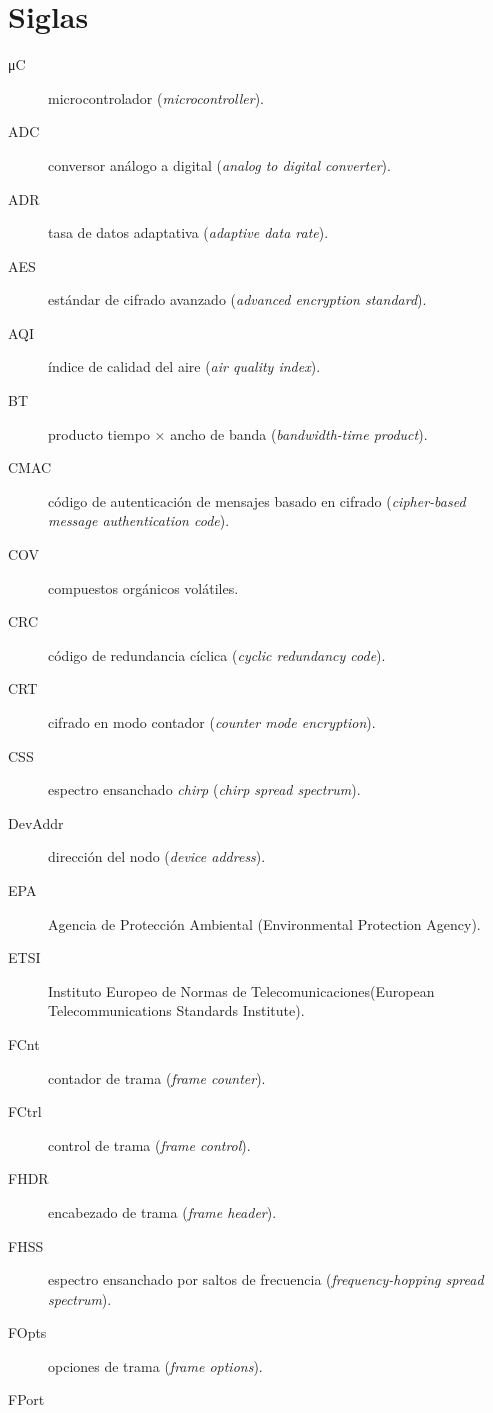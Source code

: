 \chapter*{Siglas}
\thispagestyle{empty}

\begin{description}
  \item[μC]
    microcontrolador (\emph{microcontroller}).
  \item[ADC]
    conversor análogo a digital (\emph{analog to digital converter}).
  \item[ADR]
    tasa de datos adaptativa (\emph{adaptive data rate}).
  \item[AES]
    estándar de cifrado avanzado (\emph{advanced encryption standard}).
  \item[AQI]
    índice de calidad del aire (\emph{air quality index}).
  \item[BT]
    producto tiempo × ancho de banda (\emph{bandwidth-time product}).
  \item[CMAC]
    código de autenticación de mensajes basado en cifrado (\emph{cipher-based message authentication code}).
  \item[COV]
    compuestos orgánicos volátiles.
  \item[CRC]
    código de redundancia cíclica (\emph{cyclic redundancy code}).
  \item[CRT]
    cifrado en modo contador (\emph{counter mode encryption}).
  \item[CSS]
    espectro ensanchado \emph{chirp} (\emph{chirp spread spectrum}).
  \item[DevAddr]
    dirección del nodo (\emph{device address}).
  \item[EPA]
    Agencia de Protección Ambiental (Environmental Protection Agency).
  \item[ETSI]
    Instituto Europeo de Normas de Telecomunicaciones\foreignlanguage{english}{(European Telecommunications Standards Institute)}.
  \item[FCnt]
    contador de trama (\emph{frame counter}).
  \item[FCtrl]
    control de trama (\emph{frame control}).
  \item[FHDR]
    encabezado de trama (\emph{frame header}).
  \item[FHSS]
    espectro ensanchado por saltos de frecuencia (\emph{frequency-hopping spread spectrum}).
  \item[FOpts]
    opciones de trama (\emph{frame options}).
  \item[FPort]

\end{description}
